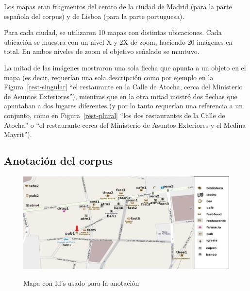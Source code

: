 Los mapas eran fragmentos del centro de la ciudad de Madrid (para la parte espa\~nola del corpus) y de Lisboa (para la parte portuguesa).

Para cada ciudad, se utilizaron 10 mapas con distintas ubicaciones. Cada ubicaci\'on se muestra con un nivel X y 2X de zoom, haciendo 20 im\'agenes en total. En ambos niveles de zoom el objetivo se\~{n}alado se mantuvo.%

La mitad de las im\'agenes mostraron una sola flecha que apunta a un objeto en el mapa (es decir, requer\'{i}an una sola descripci\'on como por ejemplo en la Figura~\ref{rest-singular} ``el restaurante en la Calle de Atocha, cerca del Ministerio de Asuntos Exteriores''), mientras que en la otra mitad mostr\'o dos flechas que apuntaban a dos lugares diferentes (y por lo tanto requer\'ian una referencia a un conjunto, como en Figura~\ref{rest-plural} ``los dos restaurantes de la Calle de Atocha'' o ``el restaurante cerca del Ministerio de Asuntos Exteriores y el Medina Mayrit'').


\subsection{Anotaci\'on del corpus}
\label{corpus-anotacion}

\begin{figure}
\centering
\includegraphics[width=\textwidth]{figures/mapa-con-ids2.png}\\[0pt]
\caption{Mapa con Id's usado para la anotaci\'on}
\label{mapa-con-ids}
\end{figure}

